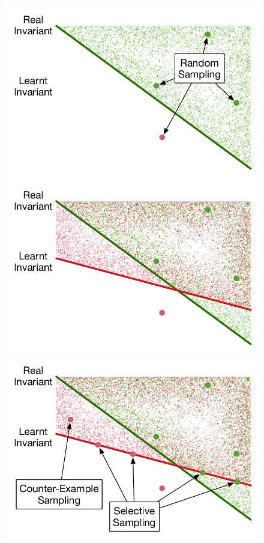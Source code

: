 \begin{figure}[t]
        \centering
        \includegraphics[scale=0.3]{figures/general-sampling-0.pdf}
        \centering
        \includegraphics[scale=0.3]{figures/general-sampling-1.pdf} \\
        \centering
        \includegraphics[scale=0.3]{figures/general-sampling-2.pdf}

\end{figure}
